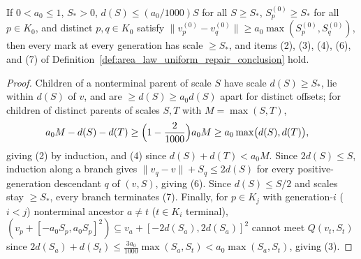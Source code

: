 \begin{lemma}
    \label{lem:area_law_repair_metric_invariants}
    \leanok
    If $0<a_0\le1$, $S_*>0$, $d(S)\le(a_0/1000)S$ for all $S\ge S_*$, $S_p^{(0)}\ge S_*$ for all
    $p\in K_0$, and distinct $p,q\in K_0$ satisfy $\lVert v_p^{(0)}-v_q^{(0)}\rVert\ge a_0\max(S_p^{(0)},S_q^{(0)})$,
    then every mark at every generation has scale $\ge S_*$, and items (2), (3), (4), (6), and (7)
    of Definition~\ref{def:area_law_uniform_repair_conclusion} hold.
\end{lemma}

\begin{proof}
    \leanok
    Children of a nonterminal parent of scale $S$ have scale $d(S)\ge S_*$, lie within $d(S)$ of $v$,
    and are $\ge d(S)\ge a_0d(S)$ apart for distinct offsets; for children of distinct parents of
    scales $S,T$ with $M=\max(S,T)$,
    \begin{align}
        a_0M-d(S)-d(T) & \ge\Bigl(1-\frac{2}{1000}\Bigr)a_0M
        \ge a_0\max\bigl(d(S),d(T)\bigr),
        \notag
    \end{align}
    giving (2) by induction, and (4) since $d(S)+d(T)<a_0M$. Since $2d(S)\le S$, induction along a
    branch gives $\lVert v_q-v\rVert+S_q\le2d(S)$ for every positive-generation descendant $q$ of
    $(v,S)$, giving (6). Since $d(S)\le S/2$ and scales stay $\ge S_*$, every branch terminates (7).
    Finally, for $p\in K_j$ with generation-$i$ ($i<j$) nonterminal ancestor $a\ne t$ ($t\in K_i$ terminal),
    $(v_p+[-a_0S_p,a_0S_p]^2)\subseteq v_a+[-2d(S_a),2d(S_a)]^2$ cannot meet $Q(v_t,S_t)$ since
    $2d(S_a)+d(S_t)\le\frac{3a_0}{1000}\max(S_a,S_t)<a_0\max(S_a,S_t)$, giving (3).
\end{proof}

